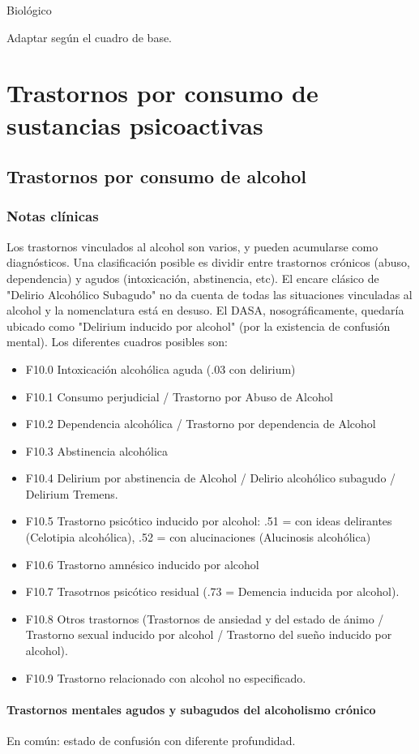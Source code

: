 \documentclass{scrbook}
\begin{document}
Biológico

Adaptar según el cuadro de base.
\printbibliography
\part{Trastornos por consumo de sustancias psicoactivas}
\chapter{Trastornos por consumo de alcohol}
\section*{Notas clínicas}
Los trastornos vinculados al alcohol son varios, y pueden acumularse como diagnósticos. Una clasificación posible es dividir entre trastornos crónicos (abuso, dependencia) y agudos (intoxicación, abstinencia, etc). El encare clásico de "Delirio Alcohólico Subagudo" no da cuenta de todas las situaciones vinculadas al alcohol y la nomenclatura está en desuso. El DASA, nosográficamente, quedaría ubicado como "Delirium inducido por alcohol" (por la existencia de confusión mental). Los diferentes cuadros posibles son\cite{cie102000}:
\begin{itemize}
\item F10.0 Intoxicación alcohólica aguda (.03 con delirium)
\item F10.1 Consumo perjudicial / Trastorno por Abuso de Alcohol
\item F10.2 Dependencia alcohólica / Trastorno por dependencia de Alcohol
\item F10.3 Abstinencia alcohólica
\item F10.4 Delirium por abstinencia de Alcohol / Delirio alcohólico subagudo / Delirium Tremens.
\item F10.5 Trastorno psicótico inducido por alcohol: .51 = con ideas delirantes (Celotipia alcohólica), .52 = con alucinaciones (Alucinosis alcohólica)
\item F10.6 Trastorno amnésico inducido por alcohol
\item F10.7 Trasotrnos psicótico residual (.73 = Demencia inducida por alcohol).
\item F10.8 Otros trastornos (Trastornos de ansiedad y del estado de ánimo / Trastorno sexual inducido por alcohol / Trastorno del sueño inducido por alcohol).
\item F10.9 Trastorno relacionado con alcohol no especificado.
\end{itemize}
\subsection*{Trastornos mentales agudos y subagudos del alcoholismo crónico}
En común: estado de confusión con diferente profundidad\cite{ey1996}.
\end{document}
